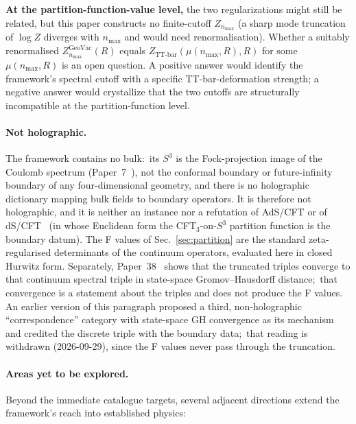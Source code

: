 \documentclass[11pt,a4paper]{article}
\theoremstyle{plain}
\theoremstyle{definition}
\newcommand{\nmax}{n_{\max}}
\newcommand{\sthree}{S^{3}}
\begin{document}
\textbf{At the partition-function-value level,} the two regularizations
might still be related, but this paper constructs no finite-cutoff
$Z_{\nmax}$ (a sharp mode truncation of $\log Z$ diverges with $\nmax$
and would need renormalisation). Whether a suitably renormalised
$Z_{\nmax}^{\text{GeoVac}}(R)$ equals $Z_{\text{TT-bar}}(\mu(\nmax, R),
R)$ for some $\mu(\nmax, R)$ is an open question. A positive answer would identify the framework's
spectral cutoff with a specific TT-bar-deformation strength; a negative
answer would crystallize that the two cutoffs are structurally
incompatible at the partition-function level.

\paragraph{Not holographic.}
\label{para:category_iii_position}
The framework contains no bulk:\ its $\sthree$ is the Fock-projection
image of the Coulomb spectrum (Paper~7~\cite{paper7}), not the conformal
boundary or future-infinity boundary of any four-dimensional geometry,
and there is no holographic dictionary mapping bulk fields to boundary
operators. It is therefore not holographic, and it is neither an
instance nor a refutation of AdS/CFT or of dS/CFT~\cite{strominger2001,
maldacena2002} (in whose Euclidean form the CFT$_{3}$-on-$\sthree$
partition function is the boundary datum). The F values of
Sec.~\ref{sec:partition} are the standard zeta-regularised determinants
of the continuum operators, evaluated here in closed Hurwitz form.
Separately, Paper~38~\cite{paper38} shows that the truncated triples
converge to that continuum spectral triple in state-space
Gromov--Hausdorff distance;\ that convergence is a statement about the
triples and does not produce the F values. An earlier version of this
paragraph proposed a third, non-holographic ``correspondence'' category
with state-space GH convergence as its mechanism and credited the
discrete triple with the boundary data;\ that reading is withdrawn
(2026-09-29), since the F values never pass through the truncation.

\paragraph{Areas yet to be explored.}
Beyond the immediate catalogue targets, several adjacent directions
extend the framework's reach into established physics:
\end{document}
